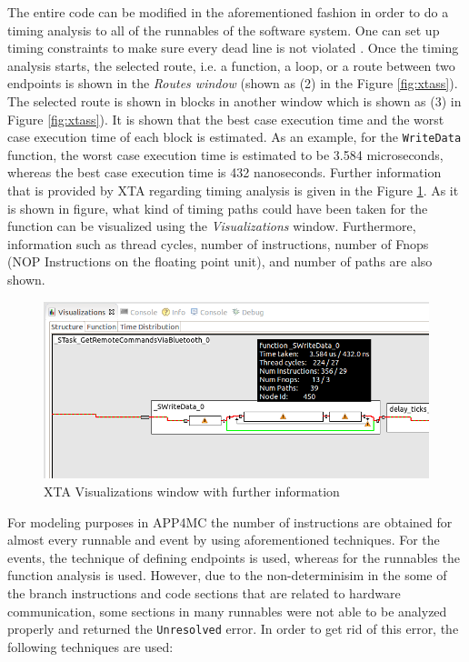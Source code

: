 The entire code can be modified in the aforementioned fashion in order to do a timing analysis to all of the runnables of the software system. One can set up timing constraints to make sure every dead line is not violated \cite{xtamanual}. Once the timing analysis starts, the selected route, i.e. a function, a loop, or a route between two endpoints is shown in the \textit{Routes window} (shown as (2) in the Figure \ref{fig:xtass}). The selected route is shown in blocks in another window which is shown as (3) in Figure \ref{fig:xtass}). It is shown that the best case execution time and the worst case execution time of each block is estimated. As an example, for the \texttt{WriteData} function, the worst case execution time is estimated to be 3.584 microseconds, whereas the best case execution time is 432 nanoseconds. Further information that is provided by XTA regarding timing analysis is given in the Figure \ref{fig:xtafurther}. As it is shown in figure, what kind of timing paths could have been taken for the function can be visualized using the \textit{Visualizations} window. Furthermore, information such as thread cycles, number of instructions, number of Fnops (NOP Instructions on the floating point unit), and number of paths are also shown.

\begin{figure}[!ht]
	\centering
	\captionsetup{justification=centering}
	\includegraphics[width=\textwidth]{content/images/xtafurther.png}
	\caption{XTA Visualizations window with further information}
	\label{fig:xtafurther}
\end{figure}

For modeling purposes in APP4MC the number of instructions are obtained for almost every runnable and event by using aforementioned techniques. For the events, the technique of defining endpoints is used, whereas for the runnables the function analysis is used. However, due to the non-determinisim in the some of the branch instructions and code sections that are related to hardware communication, some sections in many runnables were not able to be analyzed properly and returned the \texttt{Unresolved} error. In order to get rid of this error, the following techniques are used:

